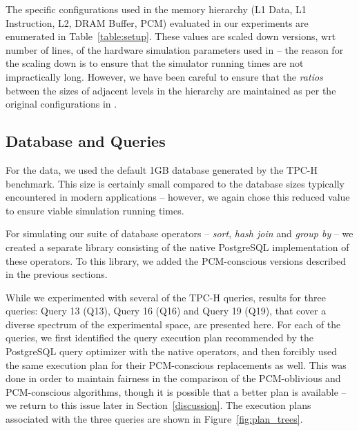 \vspace{-0.4in}
The specific configurations used in the memory hierarchy (L1 Data,
L1 Instruction, L2, DRAM Buffer, PCM) evaluated in our experiments are
enumerated in Table~\ref{table:setup}.  These values are scaled down
versions, wrt number of lines, of the hardware simulation parameters used
in \cite{wear} -- the reason for the scaling down is to ensure that the
simulator running times are not impractically long. However, we have been
careful to ensure that the \emph{ratios} between the sizes of adjacent
levels in the hierarchy are maintained as per the original configurations
in \cite{wear}.  

\begin{comment}
Further, note that the read-to-write latency ratio is
1:4, significantly lower than the 1:20 of Table ~\ref{tab:tab_pcm_char}
in the Introduction. We wish to point out that this makes our results
\emph{conservative} -- if the ratio is made 1:20, the performance
improvements of the new algorithms  are even more substantial.
\end{comment}




\subsection{Database and Queries}
For the data, we used the default 1GB database generated by the TPC-H
benchmark.  This size is certainly small compared to the database sizes
typically encountered in modern applications -- however, we again chose
this reduced value to ensure viable simulation running times.

For simulating our suite of database operators -- \textit{sort},
\textit{hash join} and \textit{group by} -- we created a separate library
consisting of the native PostgreSQL implementation of these operators. To
this library, we added the PCM-conscious versions described in the
previous sections.

While we experimented with several of the TPC-H queries, results for
three queries: Query 13 (Q13), Query 16 (Q16) and Query 19 (Q19), that
cover a diverse spectrum of the experimental space, are presented here.
For each of the queries, we first identified the query execution plan
recommended by the PostgreSQL query optimizer with the native operators,
and then forcibly used the same execution plan for their PCM-conscious
replacements as well. This was done in order to maintain fairness in the
comparison of the PCM-oblivious and PCM-conscious algorithms, though it
is possible that a better plan is available -- we return to this issue 
later in Section~\ref{discussion}. 
The execution plans associated with the three queries are shown in Figure~\ref{fig:plan_trees}. 
 


